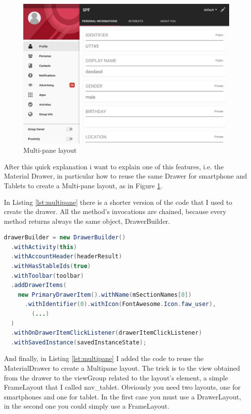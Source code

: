 \begin{figure}[thpb]
	\centering
	\includegraphics[scale=0.3]{./images/chap3/tablet1.png}
	\caption{Multi-pane layout}
	\label{fig:tablet1}
\end{figure}	


After this quick explanation i want to explain one of this features, i.e. the Material Drawer, in particular how to reuse the same Drawer for smartphone and Tablets to create a Multi-pane layout, as in Figure \ref{fig:tablet1}.

In Listing \ref{lst:multipane} there is a shorter version of the code that I used to create the drawer. All the method's invocations are chained, because every method returns always the same object, DrawerBuilder.


\begin{lstlisting}[caption={DrawerBuilder creations},label=lst:drawerbuilder, language=Java]
drawerBuilder = new DrawerBuilder()
  .withActivity(this)
  .withAccountHeader(headerResult)
  .withHasStableIds(true)
  .withToolbar(toolbar)
  .addDrawerItems(
    new PrimaryDrawerItem().withName(mSectionNames[0])
      .withIdentifier(0).withIcon(FontAwesome.Icon.faw_user),
    	(...)
  )
  .withOnDrawerItemClickListener(drawerItemClickListener)
  .withSavedInstance(savedInstanceState);
\end{lstlisting}


And finally, in Listing \ref{lst:multipane} I added the code to reuse the MaterialDrawer to create a Multipane layout. The trick is to the view obtained from the drawer to the viewGroup related to the layout's element, a simple FrameLayout that I called \textsf{nav\_tablet}. Obviously you need two layouts, one for smartphones and one for tablet. In the first case you must use a DrawerLayout, in the second one you could simply use a FrameLayout.


